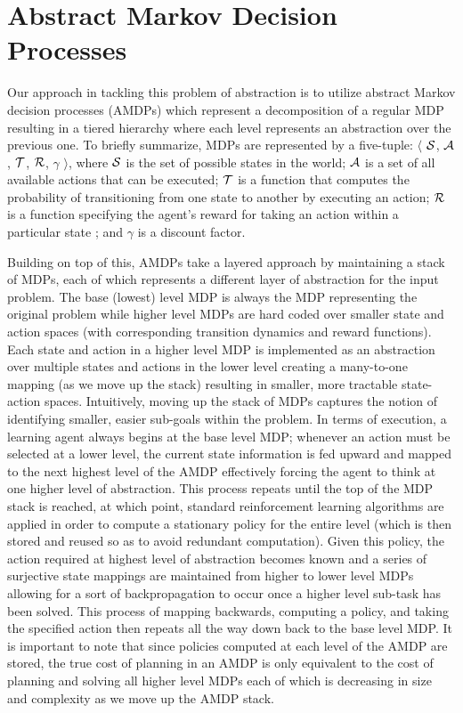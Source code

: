 \documentclass[conference]{IEEEtran}
\begin{document}
\section{Abstract Markov Decision Processes}

Our approach in tackling this problem of abstraction is to utilize abstract Markov decision processes (AMDPs) which represent a decomposition of a regular MDP resulting in a tiered hierarchy where each level represents an abstraction over the previous one. To briefly summarize, MDPs are represented by a five-tuple: $\langle$ ${\cal S}$, ${\cal A}$, ${\cal T}$, ${\cal R}$, $\gamma$ $\rangle$, where ${\cal S}$ is the set of possible states in the world; ${\cal A}$ is a set of all available actions that can be executed; ${\cal T}$ is a function that computes the probability of transitioning from one state to another by executing an action; ${\cal R}$ is a function specifying the agent's reward for taking an action within a particular state ; and $\gamma$ is a discount factor.

Building on top of this, AMDPs take a layered approach by maintaining a stack of MDPs, each of which represents a different layer of abstraction for the input problem. The base (lowest) level MDP is always the MDP representing the original problem while higher level MDPs are hard coded over smaller state and action spaces (with corresponding transition dynamics and reward functions). Each state and action in a higher level MDP is implemented as an abstraction over multiple states and actions in the lower level creating a many-to-one mapping (as we move up the stack) resulting in smaller, more tractable state-action spaces. Intuitively, moving up the stack of MDPs captures the notion of identifying smaller, easier sub-goals within the problem. In terms of execution, a learning agent always begins at the base level MDP; whenever an action must be selected at a lower level, the current state information is fed upward and mapped to the next highest level of the AMDP effectively forcing the agent to think at one higher level of abstraction. This process repeats until the top of the MDP stack is reached, at which point, standard reinforcement learning algorithms are applied in order to compute a stationary policy for the entire level (which is then stored and reused so as to avoid redundant computation). Given this policy, the action required at highest level of abstraction becomes known and a series of surjective state mappings are maintained from higher to lower level MDPs allowing for a sort of backpropagation to occur once a higher level sub-task has been solved. This process of mapping backwards, computing a policy, and taking the specified action then repeats all the way down back to the base level MDP. It is important to note that since policies computed at each level of the AMDP are stored, the true cost of planning in an AMDP is only equivalent to the cost of planning and solving all higher level MDPs each of which is decreasing in size and complexity as we move up the AMDP stack.
\end{document}
